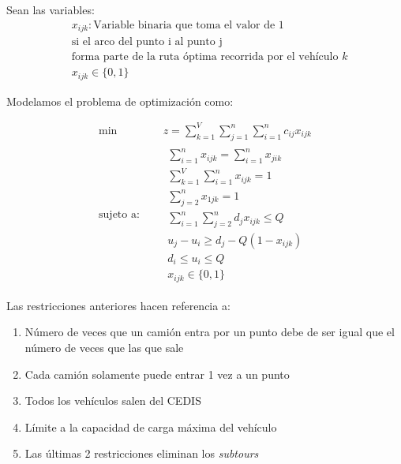 \documentclass[journal]{IEEEtran}
\begin{document}
        Sean las variables:
        \begin{align*}
            & x_{ijk}: \text{Variable binaria que toma el valor de 1}\\
            & \text{si el arco del punto i al punto j} \\
            & \text{forma parte de la ruta óptima recorrida por el vehículo } k \\
            & x_{ijk} \in \{0, 1\}
        \end{align*}
        
        Modelamos el problema de optimización como:
        
        \begin{equation*}
        	\begin{aligned}
        		\text{min } \quad & z = \sum_{k=1}^{V} \sum_{j=1}^{n} \sum_{i=1}^{n} c_{ij} x_{ijk}\\
        		\text{sujeto a: }\quad &
        		\begin{array}{c}
        			\displaystyle\sum_{i=1}^{n} x_{ijk} = \sum_{i=1}^{n} x_{jik} \\[3pt]
                    \displaystyle\sum_{k=1}^{V} \sum_{i=1}^{n} x_{ijk} = 1 \\[3pt]
                    \displaystyle\sum_{j=2}^{n} x_{1jk} = 1 \\[3pt]
                    \displaystyle\sum_{i=1}^{n} \sum_{j=2}^{n} d_{j} x_{ijk} \leq Q \\[3pt]
                    u_{j} - u_{i} \geq d_j - Q (1 - x_{ijk}) \\[3pt]
                    d_i \leq u_i \leq Q \\[3pt]
                    x_{ijk} \in \{0, 1\}
        		\end{array}
        	\end{aligned}
        \end{equation*}
        
        Las restricciones anteriores hacen referencia a:
        \begin{enumerate}
            \item Número de veces que un camión entra por un punto debe de ser igual que el número de veces que las que sale
            \item Cada camión solamente puede entrar 1 vez a un punto
            \item Todos los vehículos salen del CEDIS
            \item Límite a la capacidad de carga máxima del vehículo
            \item Las últimas 2 restricciones eliminan los \emph{subtours}
        \end{enumerate}
        
\end{document}
